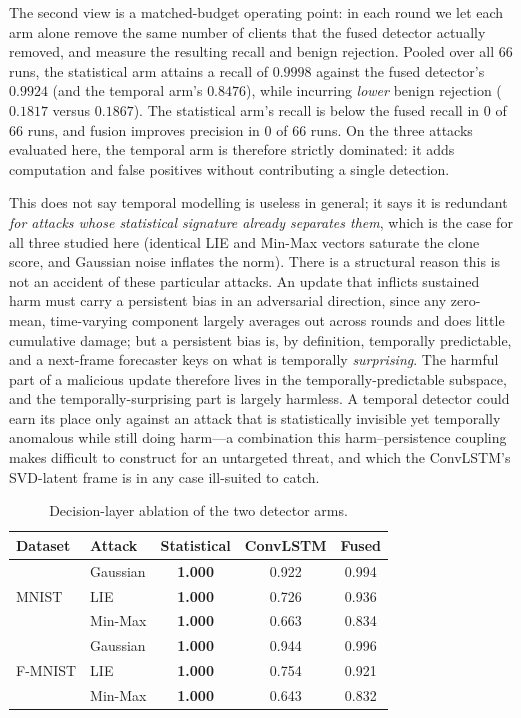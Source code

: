 \documentclass[journal]{IEEEtran}
\begin{document}
The second view is a matched-budget operating point: in each round we let each arm alone remove the same number of clients that the fused detector actually removed, and measure the resulting recall and benign rejection. Pooled over all $66$ runs, the statistical arm attains a recall of $0.9998$ against the fused detector's $0.9924$ (and the temporal arm's $0.8476$), while incurring \emph{lower} benign rejection ($0.1817$ versus $0.1867$). The statistical arm's recall is below the fused recall in $0$ of $66$ runs, and fusion improves precision in $0$ of $66$ runs. On the three attacks evaluated here, the temporal arm is therefore strictly dominated: it adds computation and false positives without contributing a single detection.

This does not say temporal modelling is useless in general; it says it is redundant \emph{for attacks whose statistical signature already separates them}, which is the case for all three studied here (identical LIE and Min-Max vectors saturate the clone score, and Gaussian noise inflates the norm). There is a structural reason this is not an accident of these particular attacks. An update that inflicts sustained harm must carry a persistent bias in an adversarial direction, since any zero-mean, time-varying component largely averages out across rounds and does little cumulative damage; but a persistent bias is, by definition, temporally predictable, and a next-frame forecaster keys on what is temporally \emph{surprising}. The harmful part of a malicious update therefore lives in the temporally-predictable subspace, and the temporally-surprising part is largely harmless. A temporal detector could earn its place only against an attack that is statistically invisible yet temporally anomalous while still doing harm---a combination this harm--persistence coupling makes difficult to construct for an untargeted threat, and which the ConvLSTM's SVD-latent frame is in any case ill-suited to catch.

\begin{table}[t]
\centering
\caption{Decision-layer ablation of the two detector arms.}
\label{tab:ablation_auc}
\setlength{\tabcolsep}{5pt}
\begin{tabular}{@{}llccc@{}}
\toprule
\textbf{Dataset} & \textbf{Attack} & \textbf{Statistical} & \textbf{ConvLSTM} & \textbf{Fused} \\
\midrule
\multirow{3}{*}{MNIST} & Gaussian & \textbf{1.000} & 0.922 & 0.994 \\
 & LIE & \textbf{1.000} & 0.726 & 0.936 \\
 & Min-Max & \textbf{1.000} & 0.663 & 0.834 \\
\midrule
\multirow{3}{*}{F-MNIST} & Gaussian & \textbf{1.000} & 0.944 & 0.996 \\
 & LIE & \textbf{1.000} & 0.754 & 0.921 \\
 & Min-Max & \textbf{1.000} & 0.643 & 0.832 \\
\bottomrule
\end{tabular}
\end{table}
\end{document}
